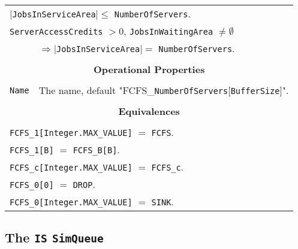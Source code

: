 \documentclass[12pt]{book}
\begin{document}
\begin{tabular}{|l|l|l|l|}
\multicolumn{4}{|l|}{$|$\lstinline|JobsInServiceArea|$| \leq$ \lstinline|NumberOfServers|.} \\
\multicolumn{4}{|l|}{\lstinline|ServerAccessCredits| $> 0$, \lstinline|JobsInWaitingArea| $\neq \emptyset$} \\
    \multicolumn{1}{|l}{}
  & \multicolumn{3}{l|}{$\Rightarrow |$\lstinline|JobsInServiceArea|$| =$ \lstinline|NumberOfServers|.} \\
\hline
\multicolumn{4}{|c|}{} \\
\multicolumn{4}{|c|}{\bf Operational Properties} \\
\multicolumn{4}{|c|}{} \\
\hline
\lstinline|Name| & \multicolumn{3}{|l|}{The name, default "FCFS\_\lstinline{NumberOfServers}[\lstinline|BufferSize|]".} \\
\hline
\multicolumn{4}{|c|}{} \\
\multicolumn{4}{|c|}{\bf Equivalences} \\
\multicolumn{4}{|c|}{} \\
\hline
\multicolumn{4}{|l|}{\lstinline|FCFS_1[Integer.MAX_VALUE]| $=$ \lstinline|FCFS|.} \\
\multicolumn{4}{|l|}{\lstinline|FCFS_1[B]| $=$ \lstinline|FCFS_B[B]|.} \\
\multicolumn{4}{|l|}{\lstinline|FCFS_c[Integer.MAX_VALUE]| $=$ \lstinline|FCFS_c|.} \\
\multicolumn{4}{|l|}{\lstinline|FCFS_0[0]| $=$ \lstinline|DROP|.} \\
\multicolumn{4}{|l|}{\lstinline|FCFS_0[Integer.MAX_VALUE]| $=$ \lstinline|SINK|.} \\
\hline
\end{tabular}

\subsection{The \lstinline{IS} \lstinline{SimQueue}}
\end{document}
